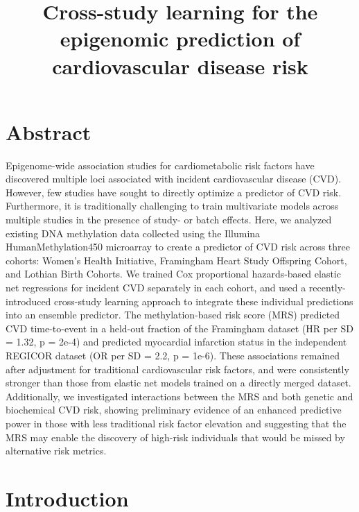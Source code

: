 \documentclass[]{article}
\title{Cross-study learning for the epigenomic prediction of cardiovascular
disease risk}
\author{}
\date{}
\begin{document}
\maketitle

\hypertarget{abstract}{%
\section{Abstract}\label{abstract}}

Epigenome-wide association studies for cardiometabolic risk factors have
discovered multiple loci associated with incident cardiovascular disease
(CVD). However, few studies have sought to directly optimize a predictor
of CVD risk. Furthermore, it is traditionally challenging to train
multivariate models across multiple studies in the presence of study- or
batch effects. Here, we analyzed existing DNA methylation data collected
using the Illumina HumanMethylation450 microarray to create a predictor
of CVD risk across three cohorts: Women's Health Initiative, Framingham
Heart Study Offspring Cohort, and Lothian Birth Cohorts. We trained Cox
proportional hazards-based elastic net regressions for incident CVD
separately in each cohort, and used a recently-introduced cross-study
learning approach to integrate these individual predictions into an
ensemble predictor. The methylation-based risk score (MRS) predicted CVD
time-to-event in a held-out fraction of the Framingham dataset (HR per
SD = 1.32, p = 2e-4) and predicted myocardial infarction status in the
independent REGICOR dataset (OR per SD = 2.2, p = 1e-6). These
associations remained after adjustment for traditional cardiovascular
risk factors, and were consistently stronger than those from elastic net
models trained on a directly merged dataset. Additionally, we
investigated interactions between the MRS and both genetic and
biochemical CVD risk, showing preliminary evidence of an enhanced
predictive power in those with less traditional risk factor elevation
and suggesting that the MRS may enable the discovery of high-risk
individuals that would be missed by alternative risk metrics.

\hypertarget{introduction}{%
\section{Introduction}\label{introduction}}
\end{document}
